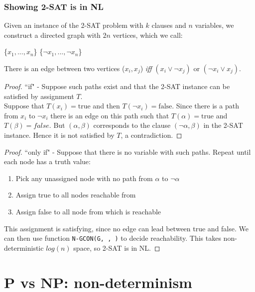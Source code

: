 \documentclass{article}
\theoremstyle{definition}
\begin{document}
\subsubsection{Showing 2-SAT is in NL}
Given an instance of the 2-SAT problem with $k$ clauses and $n$ variables, we construct a directed graph with $2n$ vertices, which we call:
\begin{center}
\{$x_{1}, ..., x_{n}$\}
\{$\neg x_{1}, ..., \neg x_{n}$\}
\end{center}
There is an edge between two vertices ($x_{i}, x_{j}$) \textit{iff} $(x_{i} \vee \neg x_{j})$ or $(\neg x_{i} \vee x_{j})$.
\begin{proof}
``if" - Suppose such paths exist and that the 2-SAT instance can be satisfied by assignment $T$. \\ 
Suppose that $T(x_{i}) = \text{true}$ and then $T(\neg x_{i}) = \text{false}$. Since there is a path from $x_{i}$ to $\neg x_{i}$ there is an edge on this path such that $T(\alpha) = \text{true}$ and $T(\beta) = false$. But $(\alpha, \beta)$ corresponds to the clause $(\neg \alpha, \beta)$ in the 2-SAT instance. Hence it is not satisfied by $T$, a contradiction.
\end{proof}
\begin{proof}
``only if" - Suppose that there is no variable with such paths. Repeat until each node has a truth value:
\begin{enumerate}
\item Pick any unassigned node \alpha with no path from $\alpha$ to $\neg \alpha$
\item Assign true to all nodes reachable from \alpha
\item Assign false to all node from which \neg \alpha is reachable
\end{enumerate}
This assignment is satisfying, since no edge can lead between true and false. We can then use function \texttt{N-GCON(G, \alpha, \neg \alpha)} to decide reachability. This takes non-deterministic $log(n)$ space, so 2-SAT is in \textsc{NL}.
\end{proof}
\section{P vs NP: non-determinism}
\end{document}
